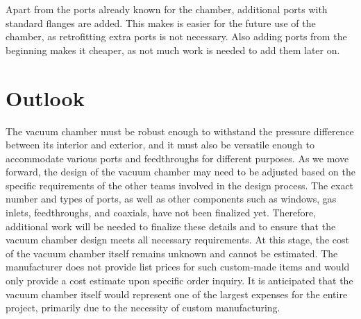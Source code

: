 Apart from the ports already known for the chamber, additional ports with standard flanges are added.
This makes is easier for the future use of the chamber, as retrofitting extra ports is not necessary.
Also adding ports from the beginning makes it cheaper, as not much work is needed to add them later on.


\section{Outlook}

The vacuum chamber must be robust enough to withstand the pressure difference between its interior and exterior, and it must also be versatile enough to accommodate various ports and feedthroughs for different purposes.
As we move forward, the design of the vacuum chamber may need to be adjusted based on the specific requirements of the other teams involved in the design process.
The exact number and types of ports, as well as other components such as windows, gas inlets, feedthroughs, and coaxials, have not been finalized yet.
Therefore, additional work will be needed to finalize these details and to ensure that the vacuum chamber design meets all necessary requirements.
At this stage, the cost of the vacuum chamber itself remains unknown and cannot be estimated.
The manufacturer does not provide list prices for such custom-made items and would only provide a cost estimate upon specific order inquiry.
It is anticipated that the vacuum chamber itself would represent one of the largest expenses for the entire project, primarily due to the necessity of custom manufacturing.
